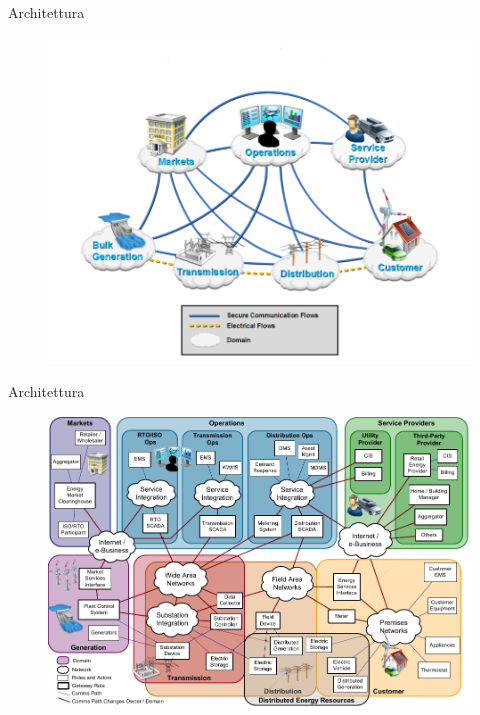 \begin{frame}[fragile]{Architettura}
	\begin{figure}[h] 
		\includegraphics[scale=0.6]{imgs/sg.png}
	\end{figure}
\end{frame}


\begin{frame}[fragile]{Architettura}
	\vspace{-10pt}
	\begin{figure}[h] 
		\includegraphics[scale=0.45]{imgs/arch.png}
	\end{figure}
\end{frame}

